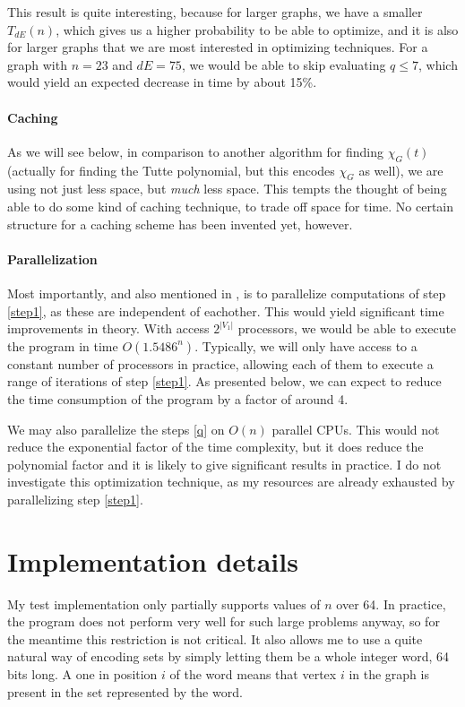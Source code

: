 \documentclass[a4paper]{article}
\begin{document}
This result is quite interesting, because for larger graphs, we have a smaller $T_{dE}(n)$, which gives us a higher probability to be able to optimize, and it is also for larger graphs that we are most interested in optimizing techniques. For a graph with $n=23$ and $dE = 75$, we would be able to skip evaluating $q\leq7$, which would yield an expected decrease in time by about 15\%\footnotemark. %


\paragraph{Caching} As we will see below, in comparison to another algorithm for finding $\chi_G(t)$ (actually for finding the Tutte polynomial, but this encodes $\chi_G$ as well), we are using not just less space, but \emph{much} less space. This tempts the thought of being able to do some kind of caching technique, to trade off space for time. No certain structure for a caching scheme has been invented yet, however.

\paragraph{Parallelization} Most importantly, and also mentioned in \cite{cov_pack}, is to parallelize computations of step \ref{step1}, as these are independent of eachother. This would yield significant time improvements in theory. With access $2^{|V_1|}$ processors, we would be able to execute the program in time $O(1.5486^n)$. Typically, we will only have access to a constant number of processors in practice, allowing each of them to execute a range of iterations of step \ref{step1}. As presented below, we can expect to reduce the time consumption of the program by a factor of around 4. %

We may also parallelize the steps \ref{q} on $O(n)$ parallel CPUs. This would not reduce the exponential factor of the time complexity, but it does reduce the polynomial factor and it is likely to give significant results in practice. I do not investigate this optimization technique, as my resources are already exhausted by parallelizing step \ref{step1}.

\section{Implementation details}
My test implementation only partially supports values of $n$ over 64. In practice, the program does not perform very well for such large problems anyway, so for the meantime this restriction is not critical. It also allows me to use a quite natural way of encoding sets by simply letting them be a whole integer word, 64 bits long. A one in position $i$ of the word means that vertex $i$ in the graph is present in the set represented by the word.
\end{document}
